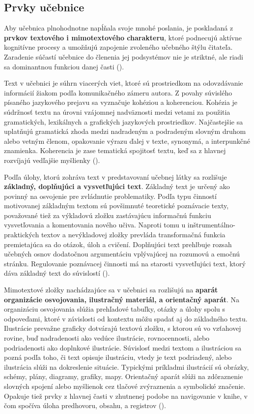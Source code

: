 \subsection{Prvky učebnice}
Aby učebnica plnohodnotne napĺňala svoje mnohé poslania, je poskladaná z \textbf{prvkov textového i mimotextového charakteru}, ktoré podnecujú aktívne kognitívne procesy a umožňujú zapojenie zvoleného učebného štýlu čitateľa. Zaradenie súčastí učebnice do členenia jej podsystémov nie je striktné, ale riadi sa dominantnou funkciou danej časti (\cite{zujev_ako_1986}).

Text v učebnici je súhrn viacerých viet, ktoré sú prostriedkom na odovzdávanie informácií žiakom podľa komunikačného zámeru autora. Z povahy súvislého písaného jazykového prejavu sa vyznačuje kohéziou a koherenciou. Kohézia je súdržnosť textu na úrovni vzájomnej nadväznosti medzi vetami za použitia gramatických, lexikálnych a grafických jazykových prostriedkov. Najčastejšie sa uplatňujú gramatická zhoda medzi nadradeným a podradeným slovným druhom alebo vetným členom, opakovanie výrazu ďalej v texte, synonymá, a interpunkčné znamienka. Koherencia je zase tematická spojitosť textu, keď sa z hlavnej rozvíjajú vedľajšie myšlienky   (\cite{gavora_ziak_1992}).

Podľa úlohy, ktorú zohráva text v predstavovaní učebnej látky sa rozlišuje \textbf{základný, doplňujúci a vysvetľujúci text}. Základný text je určený ako povinný na osvojenie pre zvládnutie problematiky. Podľa typu činností motivovanej základným textom sú povšimnuté teoretické poznávacie texty, považované tiež za výkladovú zložku zastávajúcu informačnú funkciu vysvetľovania a komentovania nového učiva. Naproti tomu u inštrumentálno-praktických textov a nevýkladovej zložky prevláda transformačná funkcia premietajúca sa do otázok, úloh a cvičení. Doplňujúci text prehlbuje rozsah učebných osnov dodatočnou argumentáciu vplývajúcej na rozumovú a emočnú stránku. Regulovanie poznávacej činnosti má na starosti vysvetľujúci text, ktorý dáva základný text do súvislostí (\cite{zujev_ako_1986}).

Mimotextové zložky nachádzajúce sa v učebnici sa rozlišujú na \textbf{aparát organizácie osvojovania, ilustračný materiál, a orientačný aparát}. Na organizáciu osvojovania slúžia prehľadové tabuľky, otázky a úlohy spolu s odpoveďami, ktoré v závislosti od kontextu môžu spadať aj do základného textu. Ilustrácie prevažne graficky dotvárajú textovú zložku, s ktorou sú vo vzťahovej rovine, buď nadradenosti ako vedúce ilustrácie, rovnocennosti, alebo podriadenosti ako doplnkové ilustrácie. Súvislosť medzi textom a ilustráciou sa pozná podľa toho, či text opisuje ilustráciu, vtedy je text podriadený, alebo ilustrácia slúži na dokreslenie situácie. Typickými príkladmi ilustrácií sú obrázky, schémy, plány, diagramy, grafiky, mapy. Orientačný aparát slúži na zdôraznenie slovných spojení alebo myšlienok cez tlačové zvýraznenia a symbolické značenie. Opakuje tiež prvky z hlavnej časti v zhutnenej podobe na navigovanie v knihe, v čom spočíva úloha predhovoru, obsahu, a registrov (\cite{zujev_ako_1986}).


